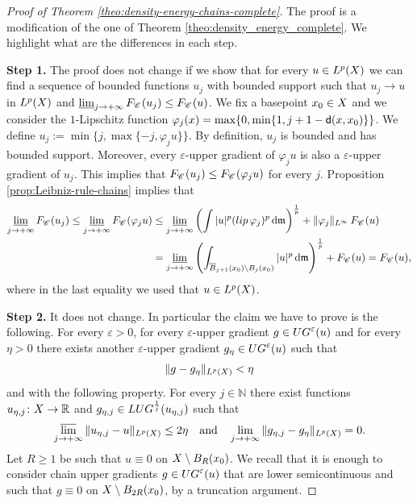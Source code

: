 \documentclass[12pt]{amsart}
\newcommand{\N}{\mathbb{N}}
\newcommand{\R}{\mathbb{R}}
\newcommand{\sfd}{{\sf d}}
\renewcommand{\d}{{\mathrm d}}
\newcommand{\limi}{\varliminf}
\newcommand{\lims}{\varlimsup}
\newcommand{\X}{{\rm X}}
\newcommand{\lip}{{\rm lip}}
\newcommand{\mm}{\mathfrak m}
\newcommand{\F}{{\rm F}}
\theoremstyle{definition}
\newcommand{\Chain}[1]{\mathscr{C}^{#1}}
\newcommand{\UG}[1]{{\rm UG}^{#1}}
\newcommand{\LUG}[1]{{\rm LUG}^{#1}}
\renewcommand{\F}[1]{{\rm F}_{{\rm #1}}}
\begin{document}
\begin{proof}[Proof of Theorem \ref{theo:density-energy-chains-complete}]
    The proof is a modification of the one of Theorem \ref{theo:density_energy_complete}. We highlight what are the differences in each step.
    
    {\bf Step 1.} The proof does not change if we show that for every $u\in L^p(\X)$ we can find a sequence of bounded functions $u_j$ with bounded support such that $u_j \to u$ in $L^p(\X)$ and $\limi_{j\to +\infty}\F{\Chain{}}(u_j) \le \F{\Chain{}}(u)$. We fix a basepoint $x_0 \in \X$ and we consider the $1$-Lipschitz function $\varphi_j(x) = \max\{0,\min\{1,j+1-\sfd(x,x_0)\}\}$. We define $u_j := \min \{j, \max\{-j, \varphi_j u\}\}$. By definition, $u_j$ is bounded and has bounded support. Moreover, every $\varepsilon$-upper gradient of $\varphi_j u$ is also a $\varepsilon$-upper gradient of $u_j$. This implies that $\F{\Chain{}}(u_j) \le \F{\Chain{}}(\varphi_j u)$ for every $j$. Proposition \ref{prop:Leibniz-rule-chains} implies that
    \begin{equation}
        \begin{aligned}
            \limi_{j\to +\infty} \F{\Chain{}}(u_j) \le \limi_{j\to +\infty} \F{\Chain{}}(\varphi_j u) &\le \limi_{j\to +\infty}\left( \int |u|^p (\lip\,\varphi_j)^p \,\d \mm \right)^{\frac{1}{p}} + \|\varphi_j\|_{L^\infty}\, \F{\Chain{}}(u)\\
            &= \limi_{j\to +\infty}\left( \int_{\overline{B}_{j+1}(x_0)\setminus B_j(x_0)} |u|^p \,\d \mm \right)^{\frac{1}{p}} +\F{\Chain{}}(u) = \F{\Chain{}}(u),
        \end{aligned}
    \end{equation}
    where in the last equality we used that $u\in L^p(\X)$.
    
    {\bf Step 2.} It does not change. In particular the claim we have to prove is the following. For every $\varepsilon > 0$, for every $\varepsilon$-upper gradient $g\in \UG{\varepsilon}(u)$ and for every $\eta > 0$ there exists another $\varepsilon$-upper gradient $g_\eta \in \UG{\varepsilon}(u)$ such that 
    \begin{equation}
        \label{eq:approx_with_g_eta_chains}
        \Vert g - g_\eta \Vert_{L^p(\X)} < \eta
    \end{equation} 
    and with the following property. For every $j\in \N$ there exist functions $u_{\eta,j} \colon \X \to \R$ and $g_{\eta,j}\in \LUG{\frac{1}{j}}(u_{\eta,j})$ such that 
    \begin{equation}
        \label{eq:approx_with_u_eta,j_chain}
        \lims_{j\to +\infty} \Vert u_{\eta,j} - u \Vert_{L^p(\X)} \le 2\eta \quad \text{and} \quad \lim_{j\to +\infty} \Vert g_{\eta,j} - g_\eta \Vert_{L^p(\X)} = 0.
    \end{equation}
    Let $R\ge 1$ be such that $u\equiv 0$ on $\X\setminus B_{R}(x_0)$. We recall that it is enough to consider chain upper gradients $g\in \UG{\varepsilon}(u)$ that are lower semicontinuous and such that $g \equiv 0$ on $\X \setminus B_{2R}(x_0)$, by a truncation argument.


\end{proof}
\end{document}
